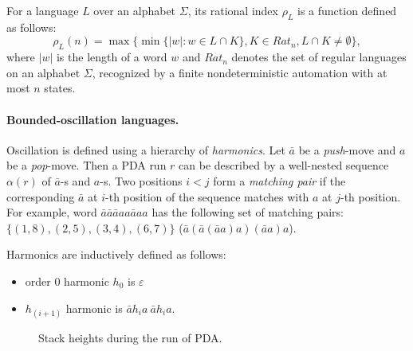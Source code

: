  For a language $L$ over an alphabet $\Sigma$, its rational index $\rho_L$ is a function defined as follows:
$$\rho_L(n) = \max\{\min\{|w|:w \in L \cap K\}, K \in {Rat}_n, L \cap K \neq \emptyset\},$$ where $|w|$ is the length of a word $w$ and ${Rat}_n$ denotes the set of regular languages on an alphabet $\Sigma$, recognized by a finite nondeterministic automation with at most $n$ states.
\paragraph{Bounded-oscillation languages.} 
Oscillation is defined using a hierarchy of \textit{harmonics}. Let $\bar{a}$ be a \textit{push}-move and $a$ be a \textit{pop}-move. Then a PDA run $r$ can be described by a well-nested sequence $\alpha(r)$ of $\bar{a}$-s and $a$-s. Two positions $i<j$ form a \textit{matching pair} if the corresponding $\bar{a}$ at $i$-th position of the sequence matches with $a$ at $j$-th position. For example, word $\bar{a}\bar{a}\bar{a}aa\bar{a}aa$ has the following set of matching pairs: $\{(1, 8), (2, 5), (3, 4), (6, 7)\}$ ($\bar{a}(\bar{a}(\bar{a}a)a)(\bar{a}a)a$).


Harmonics are inductively defined as follows:
\begin{itemize}
\item  order 0 harmonic $h_0$ is $\varepsilon$
\item  $h_{(i+1)}$ harmonic is $\bar{a}h_ia\ \bar{a}h_ia$.
\end{itemize}
\begin{figure}
\centering
{}
\caption{Stack heights during the run of PDA.}
\label{oscb}
\end{figure}


